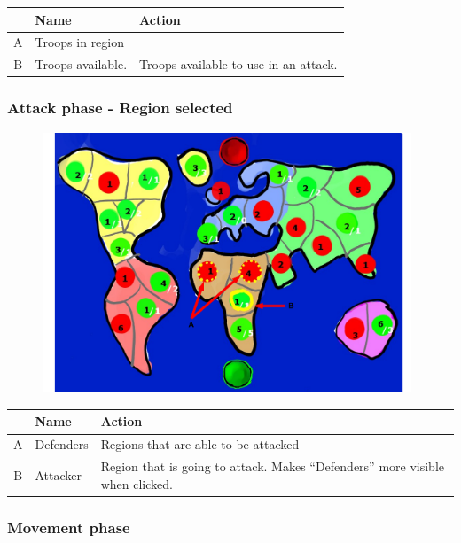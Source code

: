 \documentclass[12pt,a4paper]{article}
\begin{document}
\begin{table}[H]
\small
\centering
\begin{tabular}{c|p{5cm}|p{7cm}}
& Name & Action \\ \hline\hline
A
&Troops in region
\\B
&Troops available.
&Troops available to use in an attack.
\end{tabular}
\end{table}


\subsubsection{Attack phase - Region selected}

\begin{figure}[H]
  \centering
  \includegraphics[width=11cm]{pic/mocks/5-4.pdf}
\end{figure}

\begin{table}[H]
\small
\centering
\begin{tabular}{c|p{5cm}|p{7cm}}
& Name & Action \\ \hline\hline
A
&Defenders
&Regions that are able to be attacked
\\B
&Attacker
&Region that is going to attack. Makes “Defenders” more visible when clicked.
\end{tabular}
\end{table}


\subsubsection{Movement phase}
\end{document}
